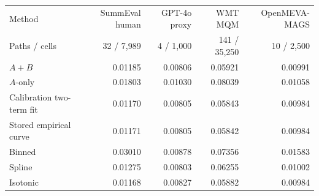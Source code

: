 \begin{tabular}{lrrrr}
\toprule
Method & SummEval human & GPT-4o proxy & WMT MQM & OpenMEVA-MAGS \\
Paths / cells & 32 / 7,989 & 4 / 1,000 & 141 / 35,250 & 10 / 2,500 \\
\midrule
$A{+}B$ & 0.01185 & 0.00806 & 0.05921 & 0.00991 \\
$A$-only & 0.01803 & 0.01030 & 0.08039 & 0.01058 \\
\midrule
Calibration two-term fit & 0.01170 & 0.00805 & 0.05843 & 0.00984 \\
Stored empirical curve & 0.01171 & 0.00805 & 0.05842 & 0.00984 \\
\midrule
Binned & 0.03010 & 0.00878 & 0.07356 & 0.01583 \\
Spline & 0.01275 & 0.00803 & 0.06255 & 0.01002 \\
Isotonic & 0.01168 & 0.00827 & 0.05882 & 0.00984 \\
\bottomrule
\end{tabular}
